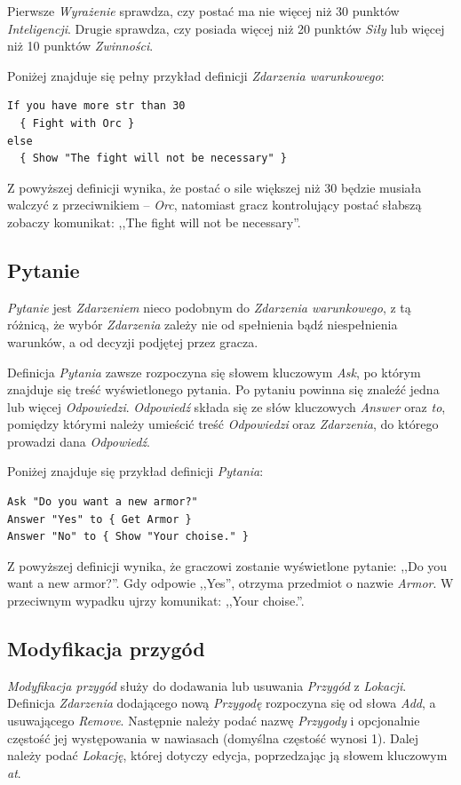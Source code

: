 \documentclass[openright]{xmgr}
\begin{document}
Pierwsze \textit{Wyrażenie} sprawdza, czy postać ma nie więcej niż 30 punktów \textit{Inteligencji}. Drugie sprawdza, czy posiada więcej niż 20 punktów \textit{Siły} lub więcej niż 10 punktów \textit{Zwinności}.

Poniżej znajduje się pełny przykład definicji \textit{Zdarzenia warunkowego}: 
\begin{verbatim}
If you have more str than 30 
  { Fight with Orc }
else 
  { Show "The fight will not be necessary" }
\end{verbatim}

Z powyższej definicji wynika, że postać o sile większej niż 30 będzie musiała walczyć z przeciwnikiem -- \textit{Orc}, natomiast gracz kontrolujący postać słabszą zobaczy komunikat: ,,The fight will not be necessary''.

\subsection*{Pytanie}
\textit{Pytanie} jest \textit{Zdarzeniem} nieco podobnym do \textit{Zdarzenia warunkowego}, z tą różnicą, że wybór \textit{Zdarzenia} zależy nie od spełnienia bądź niespełnienia warunków, a od decyzji podjętej przez gracza.

Definicja \textit{Pytania} zawsze rozpoczyna się słowem kluczowym \textit{Ask}, po którym znajduje się treść wyświetlonego pytania. Po pytaniu powinna się znaleźć jedna lub więcej \textit{Odpowiedzi}. \textit{Odpowiedź} składa się ze słów kluczowych \textit{Answer} oraz \textit{to}, pomiędzy którymi należy umieścić treść \textit{Odpowiedzi} oraz \textit{Zdarzenia}, do którego prowadzi dana \textit{Odpowiedź}. 

Poniżej znajduje się przykład definicji \textit{Pytania}:
\begin{verbatim}
Ask "Do you want a new armor?"
Answer "Yes" to { Get Armor }
Answer "No" to { Show "Your choise." }
\end{verbatim}

Z powyższej definicji wynika, że graczowi zostanie wyświetlone pytanie: ,,Do you want a new armor?''. Gdy odpowie ,,Yes'', otrzyma przedmiot o nazwie \textit{Armor}. W przeciwnym wypadku ujrzy komunikat: ,,Your choise.''.

\subsection*{Modyfikacja przygód}
\textit{Modyfikacja przygód} służy do dodawania lub usuwania \textit{Przygód} z \textit{Lokacji}. Definicja \textit{Zdarzenia} dodającego nową \textit{Przygodę} rozpoczyna się od słowa \textit{Add}, a usuwającego \textit{Remove}. Następnie należy podać nazwę \textit{Przygody} i opcjonalnie częstość jej występowania w nawiasach (domyślna częstość wynosi 1). Dalej należy podać \textit{Lokację}, której dotyczy edycja, poprzedzając ją słowem kluczowym \textit{at}.
\end{document}
